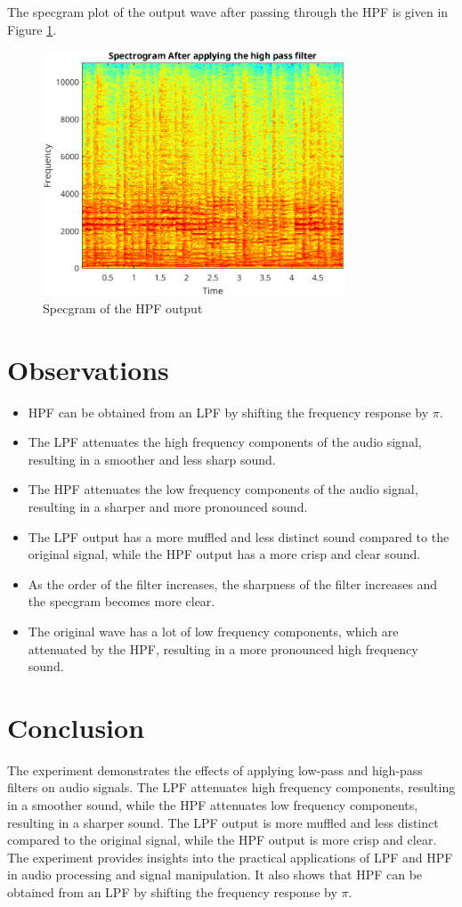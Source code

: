 \documentclass[a4paper,12pt]{article}
\begin{document}
The specgram plot of the output wave after passing through the HPF is given in Figure \ref{fig:specgramHPF}.
\begin{figure}[!h]
    \centering
    \includegraphics[width=0.8\textwidth]{figs/specHPF.png}
    \caption{Specgram of the HPF output}
    \label{fig:specgramHPF}
\end{figure}

\section*{Observations}
\begin{itemize}
    \item HPF can be obtained from an LPF by shifting the frequency response by $\pi$.
    \item The LPF attenuates the high frequency components of the audio signal, resulting in a smoother and less sharp sound.
    \item The HPF attenuates the low frequency components of the audio signal, resulting in a sharper and more pronounced sound.
    \item The LPF output has a more muffled and less distinct sound compared to the original signal, while the HPF output has a more crisp and clear sound.
    \item As the order of the filter increases, the sharpness of the filter increases and the specgram becomes more clear.
    \item The original wave has a lot of low frequency components, which are attenuated by the HPF, resulting in a more pronounced high frequency sound.
\end{itemize}

\section*{Conclusion}
The experiment demonstrates the effects of applying low-pass and high-pass filters on audio signals. The LPF attenuates high frequency components, resulting in a smoother sound, while the HPF attenuates low frequency components, resulting in a sharper sound. The LPF output is more muffled and less distinct compared to the original signal, while the HPF output is more crisp and clear. The experiment provides insights into the practical applications of LPF and HPF in audio processing and signal manipulation.
It also shows that HPF can be obtained from an LPF by shifting the frequency response by $\pi$.
\end{document}
